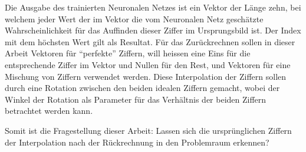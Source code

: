 \documentclass[Interploate_hadwritten_Digits.tex.tex]{subfiles}
\begin{document}
	Die Ausgabe des trainierten Neuronalen Netzes ist ein Vektor der Länge zehn, bei welchem jeder Wert der im Vektor die vom Neuronalen Netz geschätzte Wahrscheinlichkeit für das Auffinden dieser Ziffer im Ursprungsbild ist. Der Index mit dem höchsten Wert gilt als Resultat. Für das Zurückrechnen sollen in dieser Arbeit Vektoren für ``perfekte'' Ziffern, will heissen eine Eins für die entsprechende Ziffer im Vektor und Nullen für den Rest, und Vektoren für eine Mischung von Ziffern verwendet werden. Diese Interpolation der Ziffern sollen durch eine Rotation zwischen den beiden idealen Ziffern gemacht, wobei der Winkel der Rotation als Parameter für das Verhältnis der beiden Ziffern betrachtet werden kann.
	\par
	Somit ist die Fragestellung dieser Arbeit: Lassen sich die ursprünglichen Ziffern der Interpolation nach der Rückrechnung in den Problemraum erkennen?
\end{document}
